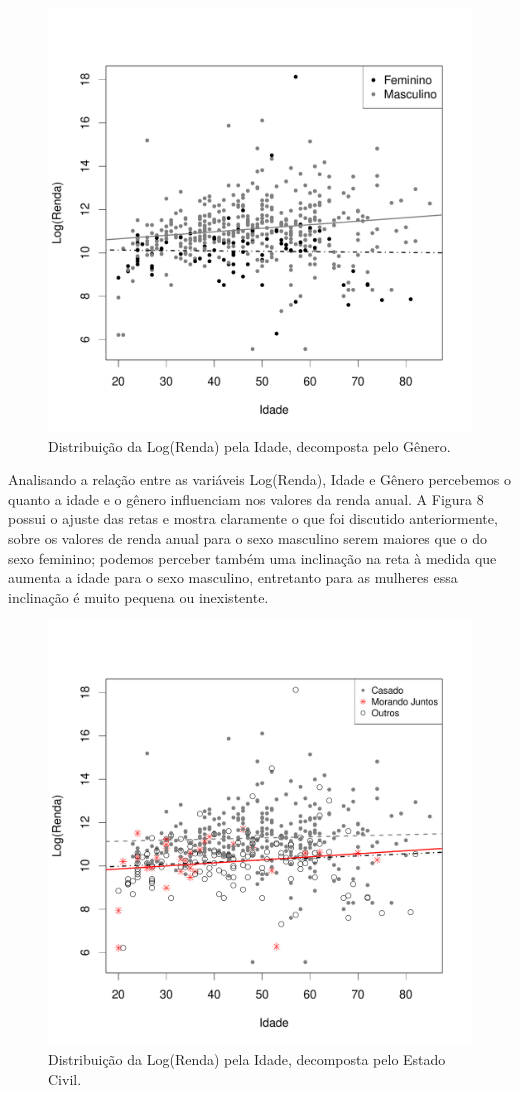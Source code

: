 \documentclass[]{article}
\begin{document}
\begin{figure}[H]

{\centering \includegraphics[width=0.6\linewidth]{p17-graf} 

}

\caption{Distribuição da Log(Renda) pela Idade, decomposta pelo Gênero.}\label{fig:unnamed-chunk-15}
\end{figure}

Analisando a relação entre as variáveis Log(Renda), Idade e Gênero
percebemos o quanto a idade e o gênero influenciam nos valores da renda
anual. A Figura 8 possui o ajuste das retas e mostra claramente o que
foi discutido anteriormente, sobre os valores de renda anual para o sexo
masculino serem maiores que o do sexo feminino; podemos perceber também
uma inclinação na reta à medida que aumenta a idade para o sexo
masculino, entretanto para as mulheres essa inclinação é muito pequena
ou inexistente.

\begin{figure}[H]

{\centering \includegraphics[width=0.6\linewidth]{p18-graf} 

}

\caption{Distribuição da Log(Renda) pela Idade, decomposta pelo Estado Civil.}\label{fig:unnamed-chunk-16}
\end{figure}
\end{document}
